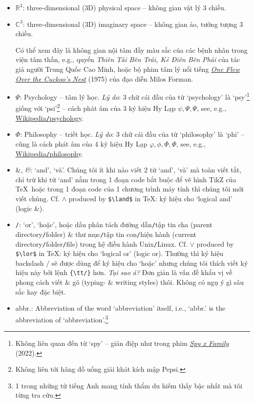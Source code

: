 \documentclass[12pt,twoside]{book}
\begin{document}
\begin{itemize}
	\item $\mathbb{R}^3$: three-dimensional (3D) physical space -- không gian vật lý 3 chiều.
	\item $\mathbb{C}^3$: three-dimensional (3D) imaginary space -- không gian ảo, tưởng tượng 3 chiều.
	
	Có thể xem đây là không gian nội tâm đầy màu sắc của các bệnh nhân trong viện tâm thần, e.g., quyển {\it Thiên Tài Bên Trái, Kẻ Điên Bên Phải} của tác giả người Trung Quốc {\sc Cao Minh}, hoặc bộ phim tâm lý nổi tiếng \href{https://www.imdb.com/title/tt0073486}{\it One Flew Over the Cuckoo's Nest} (1975) của đạo diễn {\sc Milos Forman}.
	\item $\Psi$: Psychology -- tâm lý học. {\it Lý do}: 3 chữ cái đầu của từ `psychology' là `psy'\footnote{Không liên quan đến từ `spy' -- gián điệp như trong phim \href{https://www.imdb.com/title/tt13706018}{\it Spy x Family} (2022).} giống với `psi'\footnote{Không liên tới hãng đồ uống giải khát kích mập Pepsi.} -- cách phát âm của 3 ký hiệu Hy Lạp $\psi,\Psi,\varPsi$, see, e.g., \href{https://en.wikipedia.org/wiki/Psychology}{Wikipedia{\tt/}psychology}.
	\item $\Phi$: Philosophy -- triết học. {\it Lý do}: 3 chữ cái đầu của từ `philosophy' là `phi' -- cũng là cách phát âm của 4 ký hiệu Hy Lạp $\varphi,\phi,\Phi,\varPhi$, see, e.g., \href{https://en.wikipedia.org/wiki/Philosophy}{Wikipedia{\tt/}philosophy}.
	\item \&, {\it\&}: `and', `và'. Chúng tôi ít khi nào viết 2 từ `and', `và' mà toàn viết tắt, chỉ trừ khi từ `and' nằm trong 1 đoạn code bắt buộc để vẽ hình TikZ của \TeX\ hoặc trong 1 đoạn code của 1 chương trình máy tính thì chúng tôi mới viết chúng. Cf. $\land$ produced by \verb|$\land$| in \TeX: ký hiệu cho `logical and' (logic \&).
	\item {\tt/}: `or', `hoặc', hoặc dấu phân tách đường dẫn{\tt/}tập tin cha (parent directory{\tt/}folder) \& thư mục{\tt/}tập tin con{\tt/}hiện hành (current directory{\tt/}folder{\tt/}file) trong hệ điều hành Unix{\tt/}Linux. Cf. $\lor$ produced by \verb|$\lor$| in \TeX: ký hiệu cho `logical or' (logic or). Thường thì ký hiệu backslash $/$ sẽ được dùng để ký hiệu cho `hoặc' nhưng chúng tôi thích viết ký hiệu này bởi lệnh \verb|{\tt/}| hơn. {\it Tại sao á?} Đơn giản là vấn đề khẩu vị về phong cách viết \& gõ (typing- \& writing styles) thôi. Không có ngụ ý gì sâu sắc hay đặc biệt.
	\item abbr.: Abbreviation of the word `abbreviation' itself, i.e., `abbr.' is the abbreviation of `abbreviation'.\footnote{1 trong những từ tiếng Anh mang tính thẩm du hiếm thấy bậc nhất mà tôi từng tra cứu.}

\end{itemize}
\end{document}
